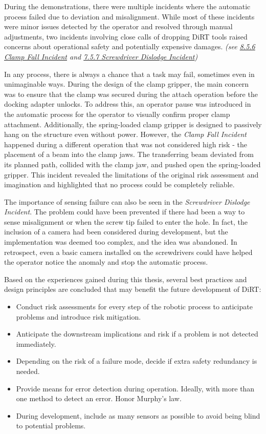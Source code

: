 \documentclass[11pt]{book}
\begin{document}
During the demonstrations, there were multiple incidents where the automatic process failed due to deviation and misalignment. While most of these incidents were minor issues detected by the operator and resolved through manual adjustments, two incidents involving close calls of dropping DiRT tools raised concerns about operational safety and potentially expensive damages. \textit{(see \uline{8.5.6 Clamp Fall Incident} and \uline{7.5.7 Screwdriver Dislodge Incident}) }

In any process, there is always a chance that a task may fail, sometimes even in unimaginable ways. During the design of the clamp gripper, the main concern was to ensure that the clamp was secured during the attach operation before the docking adapter unlocks. To address this, an operator pause was introduced in the automatic process for the operator to visually confirm proper clamp attachment. Additionally, the spring-loaded clamp gripper is designed to passively hang on the structure even without power. However, the \textit{Clamp Fall Incident} happened during a different operation that was not considered high risk - the placement of a beam into the clamp jaws. The transferring beam deviated from its planned path, collided with the clamp jaw, and pushed open the spring-loaded gripper. This incident revealed the limitations of the original risk assessment and imagination and highlighted that no process could be completely reliable.

The importance of sensing failure can also be seen in the \textit{Screwdriver Dislodge Incident}. The problem could have been prevented if there had been a way to sense misalignment or when the screw tip failed to enter the hole. In fact, the inclusion of a camera had been considered during development, but the implementation was deemed too complex, and the idea was abandoned. In retrospect, even a basic camera installed on the screwdrivers could have helped the operator notice the anomaly and stop the automatic process. 

Based on the experiences gained during this thesis, several best practices and design principles are concluded that may benefit the future development of DiRT:

\begin{itemize}
	\item Conduct risk assessments for every step of the robotic process to anticipate problems and introduce risk mitigation.

	\item Anticipate the downstream implications and risk if a problem is not detected immediately. 

	\item Depending on the risk of a failure mode, decide if extra safety redundancy is needed.

	\item Provide means for error detection during operation. Ideally, with more than one method to detect an error. Honor Murphy's law.

	\item During development, include as many sensors as possible to avoid being blind to potential problems.

\end{itemize}
\end{document}
